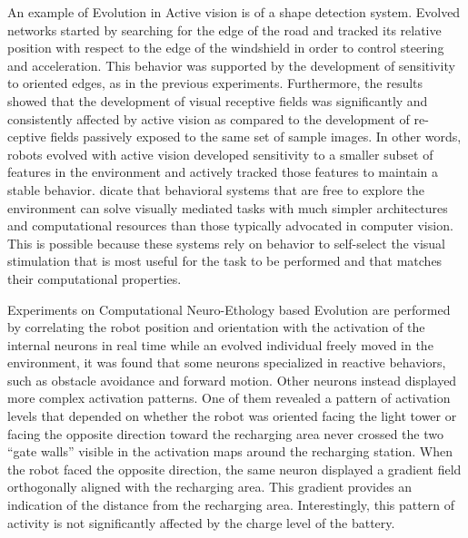 \documentclass[a4paper, 10pt]{article}
\begin{document}
An example of Evolution in Active vision is of a shape detection system. Evolved networks started by searching for the edge of the road and tracked its relative position with respect to the edge of the windshield in order to control steering and acceleration. This behavior was supported by the development of sensitivity to oriented edges, as in the previous experiments. Furthermore, the results showed that the development of visual receptive ﬁelds was signiﬁcantly and consistently affected by active vision as compared to the development of re-ceptive ﬁelds passively exposed to the same set of sample images. In other words, robots evolved with active vision developed sensitivity to a smaller subset of features in the environment and actively tracked those features to maintain a stable behavior. dicate that behavioral systems that are free to explore the environment can solve visually mediated tasks with
much simpler architectures and computational resources than those typically advocated in computer vision. This is possible because these systems rely on behavior to self-select the visual stimulation that is most useful for the task to be performed and that matches their computational properties.

Experiments on Computational Neuro-Ethology based Evolution are performed by correlating the robot position and orientation with the activation of the internal neurons in real time while an evolved individual freely moved in the environment, it was found that some neurons specialized in reactive behaviors, such as obstacle avoidance and forward motion. Other neurons instead displayed more complex activation patterns. One of them revealed a pattern of activation levels that depended on whether the robot was oriented facing the light tower or facing the opposite direction toward the recharging area never crossed the two “gate walls” visible in the activation maps around the recharging station. When the robot faced the opposite direction, the same neuron displayed a gradient ﬁeld orthogonally aligned with the recharging area. This gradient provides an indication of the distance from the recharging area. Interestingly, this pattern of activity is not significantly affected by the charge level of the battery.
\end{document}

